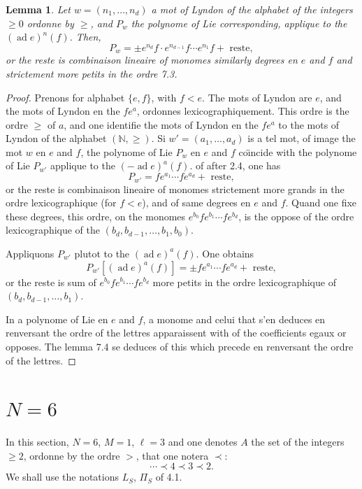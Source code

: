 \documentclass[11pt,a4paper]{article}
\theoremstyle{plain}
\newtheorem{lemma}[theorem]{Lemma}
\theoremstyle{definition}
\DeclareMathOperator{\ad}{ad}
\newcommand{\N}{\mathbb{N}}
\begin{document}
\begin{lemma}\label{lem:7.4}
Let $w = (n_1,\ldots,n_d)$ a mot of Lyndon of the alphabet of the integers $\geq 0$ ordonne by $\geq$, and $P_w$ the polynome of Lie corresponding, applique to the $(\ad e)^n(f)$. Then,
\begin{equation}\label{eq:7.4.1}
P_w = \pm e^{n_d}f \cdot e^{n_{d-1}}f \cdots e^{n_1}f + \text{ reste},
\end{equation}
or the reste is combinaison lineaire of monomes similarly degrees en $e$ and $f$ and strictement more petits in the ordre 7.3.
\end{lemma}

\begin{proof}
Prenons for alphabet $\{e, f\}$, with $f < e$. The mots of Lyndon are $e$, and the mots of Lyndon en the $fe^a$, ordonnes lexicographiquement. This ordre is the ordre $\geq$ of $a$, and one identifie the mots of Lyndon en the $fe^a$ to the mots of Lyndon of the alphabet $(\N, \geq)$. Si $w' = (a_1,\ldots,a_d)$ is a tel mot, of image the mot $w$ en $e$ and $f$, the polynome of Lie $P_w$ en $e$ and $f$ co\"{\i}ncide with the polynome of Lie $P_{w'}$ applique to the $(-\ad e)^a(f)$. of after 2.4, one has
\[
P_{w'} = fe^{a_1} \cdots fe^{a_d} + \text{ reste},
\]
or the reste is combinaison lineaire of monomes strictement more grands in the ordre lexicographique (for $f < e$), and of same degrees en $e$ and $f$. Quand one fixe these degrees, this ordre, on the monomes $e^{b_0}fe^{b_1} \cdots fe^{b_d}$, is the oppose of the ordre lexicographique of the $(b_d, b_{d-1},\ldots, b_1, b_0)$.

Appliquons $P_{w'}$ plutot to the $(\ad e)^a(f)$. One obtains
\[
P_{w'}[(\ad e)^a(f)] = \pm fe^{a_1} \cdots fe^{a_d} + \text{ reste},
\]
or the reste is sum of $e^{b_0}fe^{b_1} \cdots fe^{b_d}$ more petits in the ordre lexicographique of $(b_d, b_{d-1},\ldots, b_1)$.

In a polynome of Lie en $e$ and $f$, a monome and celui that s'en deduces en renversant the ordre of the lettres apparaissent with of the coefficients egaux or opposes. The lemma 7.4 se deduces of this which precede en renversant the ordre of the lettres.
\end{proof}

\section{$N=6$}
\label{sec:8}

In this section, $N=6$, $M=1$, $\ell = 3$ and one denotes $A$ the set of the integers $\geq 2$, ordonne by the ordre $>$, that one notera $\prec$:
\[
\cdots \prec 4 \prec 3 \prec 2.
\]
We shall use the notations $L_S$, $\Pi_S$ of 4.1.
\end{document}
